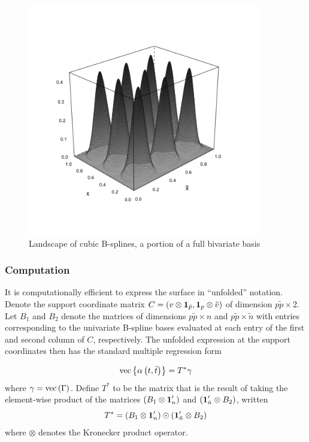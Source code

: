 \documentclass[12pt]{article}
\newcommand*\needsparaphrased{\color{red}}
\newcommand*\outlineskeleton{\color{green}}
\newcommand{\bfone}{\mbox{\boldmath $1$}}
\begin{document}
\begin{figure}[H]
  \centering
  \graphicspath{{img/}}
  \includegraphics[width=4in,height=4in]{sparse_bicubic_basis.png}
  \caption{Landscape of cubic B-splines, a portion of a full bivariate basis}\label{fig:sparse_bicubic_basis}
\end{figure}

\subsubsection{{\outlineskeleton Computation}}

It is computationally efficient to express the surface in ``unfolded'' notation. Denote the support coordinate matrix  $C = \left(v \otimes \bfone_{\tilde{p}}, \bfone_p \otimes \tilde{v}\right)$ of dimension $p\tilde{p} \times 2$. Let $B_1$ and $B_2$ denote the matrices of dimensions $p\tilde{p} \times n$ and $p\tilde{p} \times \tilde{n}$ with entries corresponding to the univariate B-spline bases evaluated at each entry of the first and second column of $C$, respectively. {\needsparaphrased The unfolded expression at the support coordinates then has the standard multiple regression form}

\begin{equation} \label{eq:coef_surface_vec_notation}
\textup{vec}\left\{\alpha\left(t, \tilde{t}\right)\right\} = T^*\gamma
\end{equation}
\noindent
 where $\gamma = \textup{vec}\left(\Gamma\right)$. Define $T^*$ to be the matrix that is the result of taking the element-wise product of the matrices $\left(B_1 \otimes \bfone_n^\prime \right)$ and $\left(\bfone_{\tilde{n}}^\prime \otimes B_2 \right)$, written
\begin{equation}
T^*  = \left(B_1 \otimes \bfone_n^\prime \right) \odot \left(\bfone_{\tilde{n}}^\prime \otimes B_2 \right)
\end{equation} 
 \noindent 
where $\otimes$ denotes the Kronecker product operator. 
\end{document}
